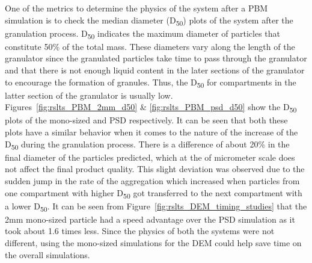 \documentclass[preprint,11pt,authoryear]{elsarticle}
\begin{document}
One of the metrics to determine the physics of the system after a PBM simulation is to check the 
median diameter (D\textsubscript{50}) plots of the system after the granulation process. 
D\textsubscript{50} indicates the maximum diameter of particles that constitute 50\% of the total mass. 
These diameters vary along the length of the granulator since the granulated particles take time to 
pass through the granulator and that there is not enough liquid content in the later sections of 
the granulator to encourage the formation of granules. Thus, the D\textsubscript{50} for compartments 
in the latter section of the granulator is usually low. Figures~\ref{fig:rslts_PBM_2mm_d50} \& 
\ref{fig:rslts_PBM_psd_d50} show the D\textsubscript{50} plots of the mono-sized and PSD respectively. 
It can be seen that both these plots have a similar behavior when it comes to the nature of the 
increase of the D\textsubscript{50} during the granulation process. There is a difference of about 
20\% in the final diameter of the particles predicted, which at the of micrometer scale does not affect 
the final product quality. This slight deviation was observed due to the sudden jump in the 
rate of the aggregation which increased when particles from one compartment with higher 
D\textsubscript{50} got transferred to the next compartment with a lower D\textsubscript{50}. 
It can be seen from Figure~\ref{fig:rslts_DEM_timing_studies} that the 2mm mono-sized particle had a speed
advantage over the PSD simulation as it took about 1.6 times less. Since the physics of both the 
systems were not different, using the mono-sized simulations for the DEM could help save time on 
the overall simulations. 
\end{document}
